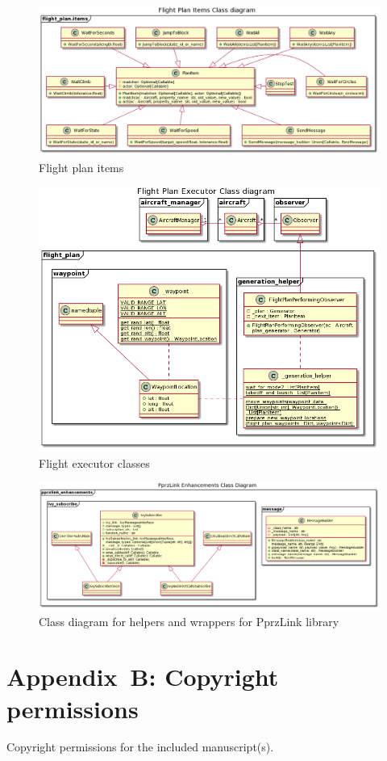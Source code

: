 \begin{figure}
    \centering
    \includegraphics[width=\textwidth]{UML/flight_plan_items_class_diagram.png}
    \caption{Flight plan items}
    \label{fig:flight_plan_items_class_diagram}
\end{figure}

\begin{figure}
    \centering
    \includegraphics[width=\textwidth]{UML/flight_plan_executor_class_diagram.png}
    \caption{Flight executor classes}
    \label{fig:flight_plan_executor_class_diagram}
\end{figure}

\begin{landscape}
\begin{figure}
    \centering
    \includegraphics[width=.7\paperheight]{UML/pprzlink_enhancements_class_diagram.png}
    \caption{Class diagram for helpers and wrappers for PprzLink library}
    \label{fig:pprzlink_enhancements_class_diagram}
\end{figure}
\end{landscape}

\chapter{Appendix~B: Copyright permissions}\label{appendixb}
Copyright permissions for the included manuscript(s).

